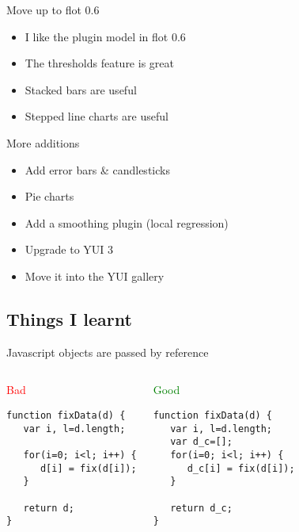 \documentclass{beamer}
\begin{document}
\begin{frame}{Move up to flot 0.6}
  \begin{itemize}
  \item I like the plugin model in flot 0.6
  \item The thresholds feature is great
  \item Stacked bars are useful
  \item Stepped line charts are useful
  \end{itemize}
\end{frame}

\begin{frame}{More additions}
  \begin{itemize}
  \item Add error bars \& candlesticks
  \item Pie charts
  \item Add a smoothing plugin (local regression)
  \item Upgrade to YUI 3
  \item Move it into the YUI gallery
  \end{itemize}
\end{frame}

\subsection{Things I learnt}
\begin{frame}[fragile]{Javascript objects are passed by reference}
  \begin{columns}[c]
    \begin{block}{\textcolor{red}{Bad}}
      \small{
      \begin{verbatim}
function fixData(d) {
   var i, l=d.length;

   for(i=0; i<l; i++) {
      d[i] = fix(d[i]);
   }

   return d;
}
      \end{verbatim}}
    \end{block}
    \begin{block}{\textcolor{green}{Good}}
      \small{
      \begin{verbatim}
function fixData(d) {
   var i, l=d.length;
   var d_c=[];
   for(i=0; i<l; i++) {
      d_c[i] = fix(d[i]);
   }

   return d_c;
}
      \end{verbatim}}
    \end{block}
  \end{columns}
\end{frame}
\end{document}
